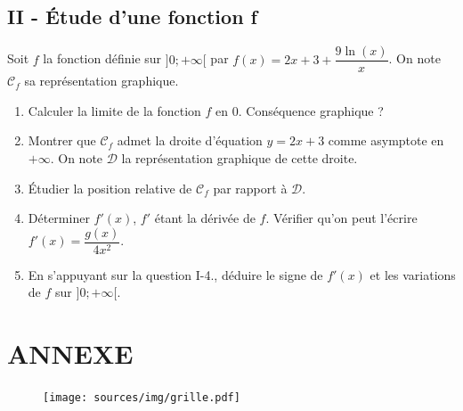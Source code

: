 \documentclass[12pt]{article}
\begin{document}
      \subsection*{II - Étude d'une fonction f}
      Soit $f$ la fonction définie sur $] 0 ; + \infty [$ par $f(x) = 2x + 3 + \dfrac{9 \ln(x)}{x}$.
      On note $\mathcal{C}_f$ sa représentation graphique.

      \begin{enumerate}
      \item[1.] Calculer la limite de la fonction $f$ en $0$. Conséquence graphique ?
      \item[2.] Montrer que $\mathcal{C}_f$ admet la droite d'équation $y = 2x + 3$ comme asymptote en $+\infty$. On note $\mathcal{D}$ la représentation graphique de cette droite.
      \item[3.] Étudier la position relative de $\mathcal{C}_f$ par rapport à $\mathcal{D}$.
      \item[4.] Déterminer $f'(x)$, $f'$ étant la dérivée de $f$. Vérifier qu'on peut l'écrire $f'(x) = \dfrac{g(x)}{4x^2}$.
      \item[5.] En s'appuyant sur la question I-4., déduire le signe de $f'(x)$ et les variations de $f$ sur  $] 0 ; + \infty [$. 
      \end{enumerate}

      \noindent\hrulefill

      \section*{ANNEXE}

      \begin{figure}[h]
        \centering
        \texttt{[image: sources/img/grille.pdf]}
      \end{figure}
\end{document}
